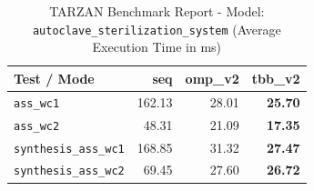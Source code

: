 \begin{table}[htbp]
\centering
\caption{TARZAN Benchmark Report - Model: \texttt{autoclave\_sterilization\_system} (Average Execution Time in ms)}
\label{tab:autoclave_sterilization_system_benchmark}
\begin{tabular}{lrrr}
\toprule
\textbf{Test / Mode} & \textbf{seq} & \textbf{omp\_v2} & \textbf{tbb\_v2} \\
\midrule
\texttt{ass\_wc1} & 162.13 & 28.01 & \textbf{25.70} \\
\texttt{ass\_wc2} & 48.31 & 21.09 & \textbf{17.35} \\
\texttt{synthesis\_ass\_wc1} & 168.85 & 31.32 & \textbf{27.47} \\
\texttt{synthesis\_ass\_wc2} & 69.45 & 27.60 & \textbf{26.72} \\
\bottomrule
\end{tabular}
\end{table}